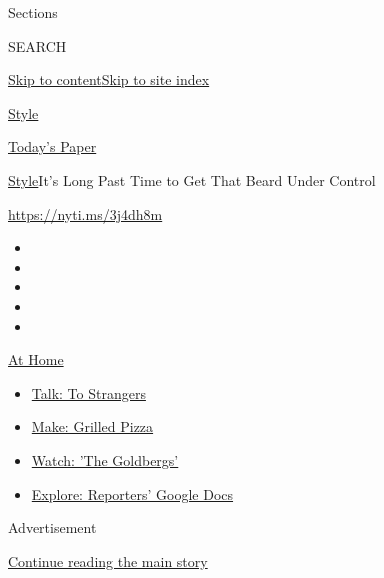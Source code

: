 Sections

SEARCH

\protect\hyperlink{site-content}{Skip to
content}\protect\hyperlink{site-index}{Skip to site index}

\href{https://www.nytimes.com/section/style}{Style}

\href{https://myaccount.nytimes.com/auth/login?response_type=cookie\&client_id=vi}{}

\href{https://www.nytimes.com/section/todayspaper}{Today's Paper}

\href{/section/style}{Style}\textbar{}It's Long Past Time to Get That
Beard Under Control

\url{https://nyti.ms/3j4dh8m}

\begin{itemize}
\item
\item
\item
\item
\item
\end{itemize}

\href{https://www.nytimes.com/spotlight/at-home?action=click\&pgtype=Article\&state=default\&region=TOP_BANNER\&context=at_home_menu}{At
Home}

\begin{itemize}
\tightlist
\item
  \href{https://www.nytimes.com/2020/08/03/well/family/the-benefits-of-talking-to-strangers.html?action=click\&pgtype=Article\&state=default\&region=TOP_BANNER\&context=at_home_menu}{Talk:
  To Strangers}
\item
  \href{https://www.nytimes.com/2020/08/01/at-home/coronavirus-make-pizza-on-a-grill.html?action=click\&pgtype=Article\&state=default\&region=TOP_BANNER\&context=at_home_menu}{Make:
  Grilled Pizza}
\item
  \href{https://www.nytimes.com/2020/07/31/arts/television/goldbergs-abc-stream.html?action=click\&pgtype=Article\&state=default\&region=TOP_BANNER\&context=at_home_menu}{Watch:
  'The Goldbergs'}
\item
  \href{https://www.nytimes.com/interactive/2020/at-home/even-more-reporters-editors-diaries-lists-recommendations.html?action=click\&pgtype=Article\&state=default\&region=TOP_BANNER\&context=at_home_menu}{Explore:
  Reporters' Google Docs}
\end{itemize}

Advertisement

\protect\hyperlink{after-top}{Continue reading the main story}

